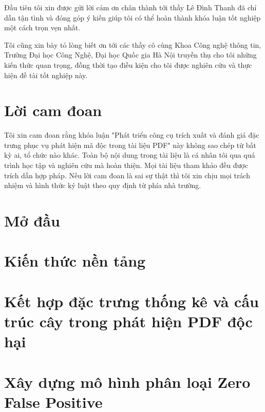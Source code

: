 \documentclass[12pt,a4paper]{report}
\begin{document}
Đầu tiên tôi xin được gửi lời cảm ơn chân thành tới thầy Lê Đình Thanh đã chỉ dẫn tận tình và đóng góp ý kiến giúp tôi có thể hoàn thành khóa luận tốt nghiệp một cách trọn vẹn nhất.

Tôi cũng xin bày tỏ lòng biết ơn tới các thầy cô cùng Khoa Công nghệ thông tin, Trường Đại học Công
Nghệ, Đại học Quốc gia Hà Nội truyền thụ cho tôi những kiến thức quan trọng, đồng thời tạo điều kiện cho tôi được nghiên cứu và thực hiện đề tài tốt nghiệp này.

\chapter*{Lời cam đoan}

Tôi xin cam đoan rằng khóa luận "Phát triển công cụ trích xuất và đánh giá đặc trưng phục vụ phát hiện mã độc trong tài liệu PDF" này không sao chép từ bất kỳ ai,
tổ chức nào khác. Toàn bộ nội dung trong tài liệu là cá nhân tôi qua quá
trình học tập và nghiên cứu mà hoàn thiện. Mọi tài liệu tham khảo đều được trích dẫn hợp pháp. Nếu lời cam đoan là sai sự thật thì tôi xin chịu mọi trách nhiệm và
hình thức kỷ luật theo quy định từ phía nhà trường.

\tableofcontents{}
\clearpage{}

\listoffigures{}

\listoftables{}

\clearpage

\chapter*{Mở đầu}



\chapter{Kiến thức nền tảng}



\chapter{Kết hợp đặc trưng thống kê và cấu trúc cây trong phát hiện PDF độc hại}



\chapter{Xây dựng mô hình phân loại Zero False Positive}
\end{document}

